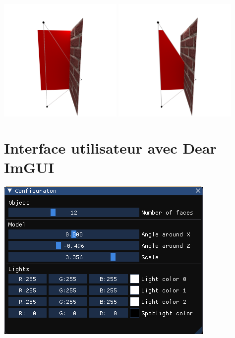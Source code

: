 \documentclass[11pt]{beamer}
\begin{document}
\begin{frame}
    \includegraphics[width=0.45\textwidth]{Reflexion/5}
    \includegraphics[width=0.45\textwidth]{Reflexion/6}
\end{frame}

\section{Interface utilisateur avec Dear ImGUI}

\begin{frame}
    {\centering \includegraphics[height=0.8\textheight]{config_window}}
\end{frame}
\end{document}
